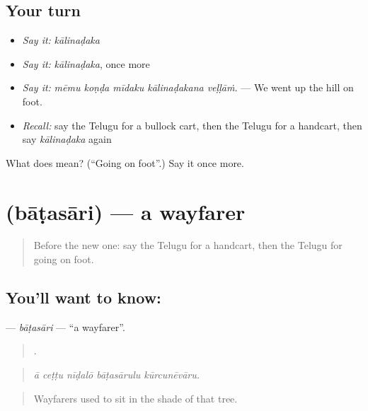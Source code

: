 \subsection*{Your turn}
\begin{itemize}
\raggedright
  \item \emph{Say it:} \emph{kālinaḍaka}
  \item \emph{Say it:} \emph{kālinaḍaka}, once more
  \item \emph{Say it:} \emph{mēmu koṇḍa mīdaku kālinaḍakana veḷḷāṁ.} — We went up the hill on foot.
  \item \emph{Recall:} say the Telugu for a bullock cart, then the Telugu for a handcart, then say \emph{kālinaḍaka} again
\end{itemize}

\begin{tcolorbox}[breakable,colback=teal!4,colframe=teal!35!black,title={Before you move on}]
What does  mean? (\textquotedblleft{}Going on foot\textquotedblright{}.) Say it once more.
\end{tcolorbox}
\section[\texorpdfstring{\te{బాటసారి} (bāṭasāri)}{బాటసారి (bāṭasāri)}]{ (bāṭasāri) — a wayfarer}

\label{lesson:TE-C451-batasari}



\begin{quote}
Before the new one: say the Telugu for a handcart, then the Telugu for going on foot.
\end{quote}

\subsection*{You'll want to know: }
\textbf{} — \emph{bāṭasāri} — \textquotedblleft{}a wayfarer\textquotedblright{}.

\begin{quote}
    .
\end{quote}

\begin{quote}
\emph{ā ceṭṭu nīḍalō bāṭasārulu kūrcunēvāru.}
\end{quote}

\begin{quote}
Wayfarers used to sit in the shade of that tree.
\end{quote}

